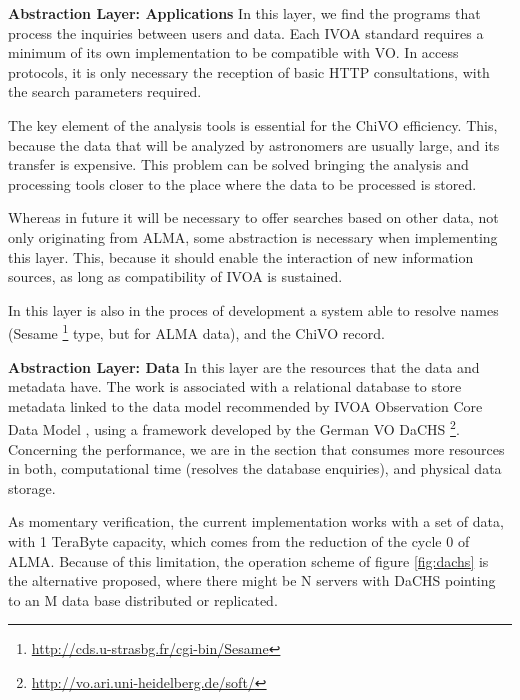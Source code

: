 \documentclass[]{spie}
\begin{document}
\textbf{Abstraction Layer:  Applications}
In this layer, we find the programs that process the inquiries between users and data.  Each IVOA standard requires a minimum of its own implementation to be compatible with VO.  In access protocols, it is only necessary the reception of basic HTTP consultations, with the search parameters required.

The key element of the analysis tools is essential for the ChiVO efficiency.  This, because the data that will be analyzed by astronomers are usually large, and its transfer is expensive.  This problem can be solved bringing the analysis and processing tools closer to the place where the data to be processed is stored.

Whereas in future it will be necessary to offer searches based on other data, not only originating from ALMA, some abstraction is necessary when implementing this layer.  This, because it should enable the interaction of new information sources, as long as compatibility of IVOA is sustained.

In this layer is also in the proces of development a system able to resolve names (Sesame \footnote{\url{http://cds.u-strasbg.fr/cgi-bin/Sesame}} type, but for ALMA data), and the ChiVO record.


\textbf{Abstraction Layer: Data}
In this layer are the resources that the data and metadata have.  The work is associated with a relational database to store metadata linked to the data model recommended by IVOA Observation Core Data Model \cite{louys2011ivoa}, using a framework developed by the German VO DaCHS \footnote{\url{http://vo.ari.uni-heidelberg.de/soft/}}.  Concerning the performance, we are in the section that consumes more resources in both, computational time (resolves the database enquiries), and physical data storage.  

As momentary verification, the current implementation works with a set of data, with 1 TeraByte capacity, which comes from the reduction of the cycle 0 of ALMA.  Because of this limitation, the operation scheme of figure \ref{fig:dachs} is the alternative proposed, where there might be N servers with DaCHS pointing to an M data base distributed or replicated.
\end{document}
